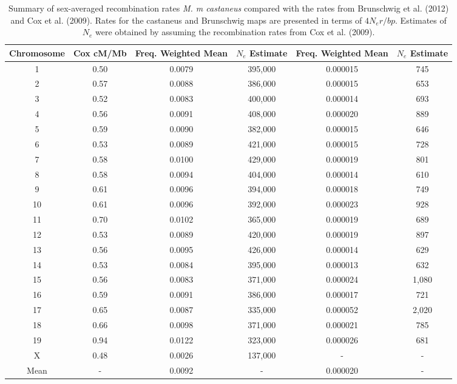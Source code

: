 
\begin{sidewaystable}
\caption[Summary of recombination rates per chromosomes]{Summary of sex-averaged recombination rates \emph{M. m castaneus} compared with the rates from Brunschwig et al. (2012) and Cox et al. (2009). Rates for the castaneus and Brunschwig maps are presented in terms of $4N_{e}r/bp$. Estimates of $N_e$ were obtained by assuming the recombination rates from Cox et al. (2009).}
 \begin{tabular}{c c c c c c} 
  \hline
 Chromosome & Cox cM/Mb & Freq. Weighted Mean & $N_e$ Estimate & Freq. Weighted Mean & $N_e$ Estimate \\ [0.5ex] 

 \hline
 1 & 0.50 & 0.0079 & 395,000 & 0.000015 & 745\\
 2 & 0.57 & 0.0088 & 386,000 & 0.000015 & 653\\
 3 & 0.52 & 0.0083 & 400,000 & 0.000014 & 693\\
 4 & 0.56 & 0.0091 & 408,000 & 0.000020 & 889\\
 5 & 0.59 & 0.0090 & 382,000 & 0.000015 & 646\\
 6 & 0.53 & 0.0089 & 421,000 & 0.000015 & 728\\
 7 & 0.58 & 0.0100 & 429,000 & 0.000019 & 801\\
 8 & 0.58 & 0.0094 & 404,000 & 0.000014 & 610\\
 9 & 0.61 & 0.0096 & 394,000 & 0.000018 & 749\\
 10 & 0.61 & 0.0096 & 392,000 & 0.000023 & 928\\
 11 & 0.70 & 0.0102 & 365,000 & 0.000019 & 689\\
 12 & 0.53 & 0.0089 & 420,000 & 0.000019 & 897\\
 13 & 0.56 & 0.0095 & 426,000 & 0.000014 & 629\\
 14 & 0.53 & 0.0084 & 395,000 & 0.000013 & 632\\
 15 & 0.56 & 0.0083 & 371,000 & 0.000024 & 1,080\\
 16 & 0.59 & 0.0091 & 386,000 & 0.000017 & 721\\
 17 & 0.65 & 0.0087 & 335,000 & 0.000052 & 2,020\\
 18 & 0.66 & 0.0098 & 371,000 & 0.000021 & 785\\
 19 & 0.94 & 0.0122 & 323,000 & 0.000026 & 681\\
 X & 0.48 & 0.0026 & 137,000 & - & -\\
 Mean & - & 0.0092 & - & 0.000020 &  -\\[1ex] 
 \hline
\end{tabular}    
 \label{tab:C2T1}

\end{sidewaystable}

